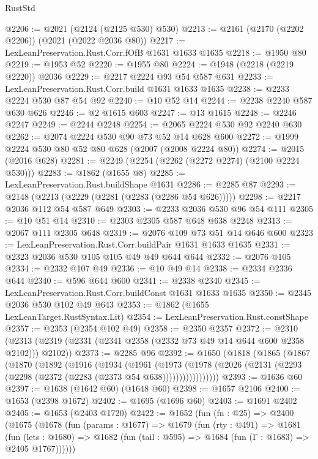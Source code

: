 \begin{lexlean}{RustStd}
\begin{coremodule}
{\begin{coremodule}
{{{{{{{{{{{{{{{{@2206 := @2021 (@2124 (@2125 @530) @530)
@2213 := @2161 (@2170 (@2202 @2206)) (@2021 (@2022 @2036 @80))
@2217 := LexLeanPreservation.Rust.Corr.fOfB @1631 @1633 @1635
@2218 := @1950 @80
@2219 := @1953 @52
@2220 := @1955 @80
@2224 := @1948 (@2218 (@2219 @2220)) @2036
@2229 := @2217 @2224 @93 @54 @587 @631
@2233 := LexLeanPreservation.Rust.Corr.build @1631 @1633 @1635
@2238 := @2233 @2224 @530 @87 @54 @92
@2240 := @10 @52 @14
@2244 := @2238 @2240 @587 @630 @626
@2246 := @2 @1615 @603
@2247 := @13 @1615
@2248 := @2246 @2247
@2249 := @2244 @2248
@2254 := @2065 @2224 @530 @92 @2240 @630
@2262 := @2074 @2224 @530 @90 @73 @52 @14 @628 @600
@2272 := @1999 @2224 @530 @80 @52 @80 @628 (@2007 (@2008 @2224 @80))
@2274 := @2015 (@2016 @628)
@2281 := @2249 (@2254 (@2262 (@2272 @2274) (@2100 @2224 @530)))
@2283 := @1862 (@1655 @8)
@2285 := LexLeanPreservation.Rust.buildShape @1631
@2286 := @2285 @87
@2293 := @2148 (@2213 (@2229 (@2281 (@2283 (@2286 @54 @626)))))
@2298 := @2217 @2036 @112 @54 @587 @649
@2303 := @2233 @2036 @530 @96 @54 @111
@2305 := @10 @51 @14
@2310 := @2303 @2305 @587 @648 @638 @2248
@2313 := @2067 @111 @2305 @648
@2319 := @2076 @109 @73 @51 @14 @646 @600
@2323 := LexLeanPreservation.Rust.Corr.buildPair @1631 @1633 @1635
@2331 := @2323 @2036 @530 @105 @105 @49 @49 @644 @644
@2332 := @2076 @105
@2334 := @2332 @107 @49
@2336 := @10 @49 @14
@2338 := @2334 @2336 @644
@2340 := @596 @644 @600
@2341 := @2338 @2340
@2345 := LexLeanPreservation.Rust.Corr.buildConst @1631 @1633 @1635
@2350 := @2345 @2036 @530 @102 @49 @643
@2353 := @1862 (@1655 LexLeanTarget.RustSyntax.Lit)
@2354 := LexLeanPreservation.Rust.constShape
@2357 := @2353 (@2354 @102 @49)
@2358 := @2350 @2357
@2372 := @2310 (@2313 (@2319 (@2331 (@2341 @2358 (@2332 @73 @49 @14 @644 @600 @2358 @2102))) @2102))
@2373 := @2285 @96
@2392 := @1650
    (@1818
      (@1865
        (@1867
          (@1870
            (@1892
              (@1916
                (@1934
                  (@1961
                    (@1973
                      (@1978
                        (@2026 (@2131 (@2293 (@2298 (@2372 (@2283 (@2373 @54 @638)))))))))))))))))
@2393 := @1636 @60
@2397 := @1638 (@1642 @60) (@1648 @60)
@2398 := @1657 @2106
@2400 := @1653 (@2398 @1672)
@2402 := @1695 (@1696 @60)
@2403 := @1691 @2402
@2405 := @1653 (@2403 @1720)
@2422 := @1652
    (fun (fn : @25) =>
    @2400
      (@1675
        (@1678
          (fun (params : @1677) =>
          @1679
            (fun (rty : @491) =>
            @1681
              (fun (lets : @1680) =>
              @1682 (fun (tail : @595) => @1684 (fun (Γ : @1683) => @2405 @1767))))))
}}}}}}}}}}}}}}}}
\end{coremodule}}
\end{coremodule}
\end{lexlean}
